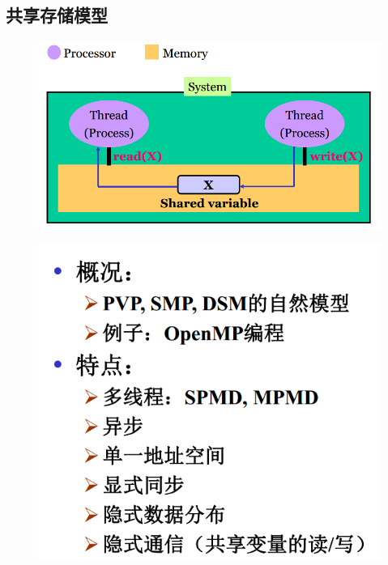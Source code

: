 \documentclass[UTF8,a4paper]{ctexart}
\begin{document}
\subsection{共享存储模型}
\begin{figure}[H]
  \centering
  \includegraphics[scale = 0.3]{assets/ParallelComputing_2a366.png}
\end{figure}
\begin{figure}[H]
  \centering
  \includegraphics[scale = 0.3]{assets/ParallelComputing_5abb7.png}
\end{figure}
\end{document}
